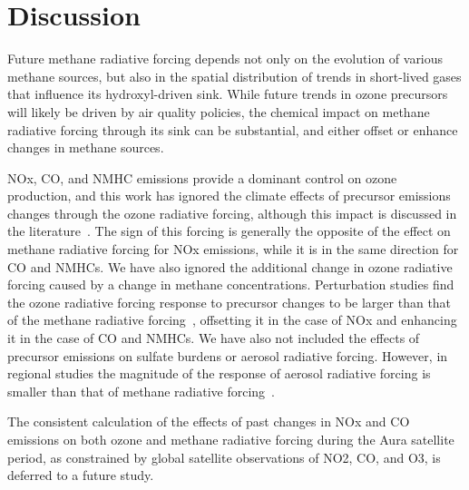 \section{Discussion}

Future methane radiative forcing depends not only on the evolution of various methane sources, but also in the spatial distribution of trends in short-lived gases that influence its hydroxyl-driven sink. While future trends in ozone precursors will likely be driven by air quality policies, the chemical impact on methane radiative forcing through its sink can be substantial, and either offset or enhance changes in methane sources.

NOx, CO, and NMHC emissions provide a dominant control on ozone production, and this work has ignored the climate effects of precursor emissions changes through the ozone radiative forcing, although this impact is discussed in the literature~\citep{ref:naik2005,ref:bowman2012,ref:shindell2013}. The sign of this forcing is generally the opposite of the effect on methane radiative forcing for NOx emissions, while it is in the same direction for CO and NMHCs. We have also ignored the additional change in ozone radiative forcing caused by a change in methane concentrations. Perturbation studies find the ozone radiative forcing response to precursor changes to be larger than that of the methane radiative forcing~\citep{ref:akimoto2015}, offsetting it in the case of NOx and enhancing it in the case of CO and NMHCs. We have also not included the effects of precursor emissions on sulfate burdens or aerosol radiative forcing. However, in regional studies the magnitude of the response of aerosol radiative forcing is smaller than that of methane radiative forcing~\citep{ref:fry2012}.

The consistent calculation of the effects of past changes in NOx and CO emissions on both ozone and methane radiative forcing during the Aura satellite period, as constrained by global satellite observations of NO2, CO, and O3, is deferred to a future study.






